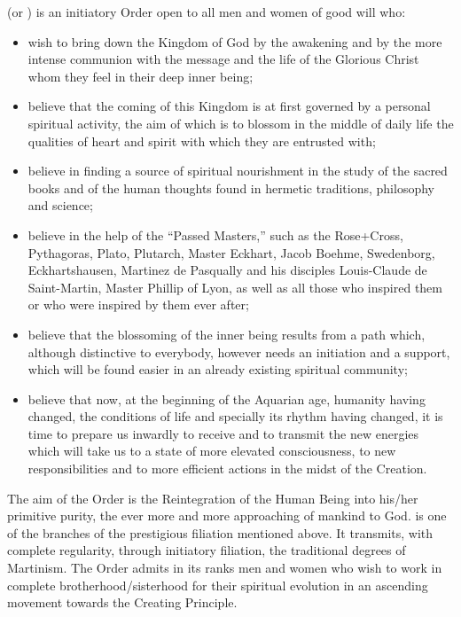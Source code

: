 %
\moupyell{} (or \moup{}) is an initiatory Order open to all men and women of good will who:

\begin{itemize}
    \item wish to bring down the Kingdom of God by the awakening and by the more intense communion with the message and the life of the Glorious Christ whom they feel in their deep inner being;
    \item believe that the coming of this Kingdom is at first governed by a personal spiritual activity, the aim of which is to blossom in the middle of daily life the qualities of heart and spirit with which they are entrusted with;
    \item believe in finding a source of spiritual nourishment in the study of the sacred books and of the human thoughts found in hermetic traditions, philosophy and science;
    \item believe in the help of the ``Passed Masters,'' such as the Rose+Cross, Pythagoras, Plato, Plutarch, Master Eckhart, Jacob Boehme, Swedenborg, Eckhartshausen, Martinez de Pasqually and his disciples Louis-Claude de Saint-Martin, Master Phillip of Lyon, as well as all those who inspired them or who were inspired by them ever after;
    \item believe that the blossoming of the inner being results from a path which, although distinctive to everybody, however needs an initiation and a support, which will be found easier in an already existing spiritual community;
    \item believe that now, at the beginning of the Aquarian age, humanity having changed, the conditions of life and specially its rhythm having changed, it is time to prepare us inwardly to receive and to transmit the new energies which will take us to a state of more elevated consciousness, to new responsibilities and to more efficient actions in the midst of the Creation.
\end{itemize}

The aim of the Order is the Reintegration of the Human Being into his/her
primitive purity, the ever more and more approaching of mankind to God. \mouplong{} is one of the
branches of the prestigious filiation mentioned above. It transmits, with complete
regularity, through initiatory filiation, the traditional degrees of Martinism. The
Order admits in its ranks men and women who wish to work in complete
brotherhood/sisterhood for their spiritual evolution in an ascending movement
towards the Creating Principle.

